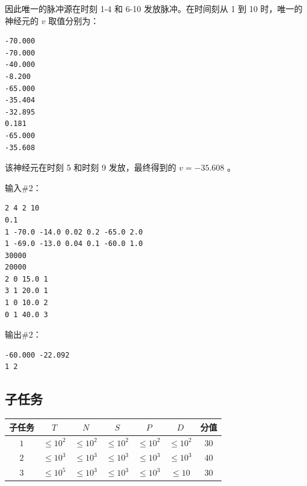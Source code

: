 因此唯一的脉冲源在时刻 1-4 和 6-10 发放脉冲。在时间刻从 1 到 10 时，唯一的神经元的 $v$ 取值分别为：

\begin{lstlisting}
-70.000
-70.000
-40.000
-8.200
-65.000
-35.404
-32.895
0.181
-65.000
-35.608
\end{lstlisting}

该神经元在时刻 5 和时刻 9 发放，最终得到的 $v=-35.608$ 。

输入\#2：

\begin{lstlisting}
2 4 2 10
0.1
1 -70.0 -14.0 0.02 0.2 -65.0 2.0
1 -69.0 -13.0 0.04 0.1 -60.0 1.0
30000
20000
2 0 15.0 1
3 1 20.0 1
1 0 10.0 2
0 1 40.0 3
\end{lstlisting}

输出\#2：

\begin{lstlisting}
-60.000 -22.092
1 2
\end{lstlisting}

\subsection*{子任务}

\begin{table}[H]
\centering
\begin{tabular}{ccccccc}
    \toprule
    子任务 & $T$ & $N$ & $S$ & $P$ & $D$ & 分值 \\
    \midrule
    $1$ & $\le 10^2$ & $\le 10^2$ & $\le 10^2$ & $\le 10^2$ & $\le 10^2$ & $30$ \\
    $2$ & $\le 10^3$ & $\le 10^3$ & $\le 10^3$ & $\le 10^3$ & $\le 10^3$ & $40$ \\
    $3$ & $\le 10^5$ & $\le 10^3$ & $\le 10^3$ & $\le 10^3$ & $\le 10$ & $30$ \\
    \bottomrule
\end{tabular}
\end{table}


